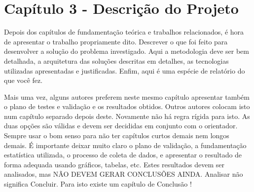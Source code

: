 
\chapter{Capítulo 3 - Descrição do Projeto}
\label{ch:projeto}

Depois dos capítulos de fundamentação teórica e trabalhos relacionados, é hora de apresentar o trabalho propriamente dito. Descrever o que foi feito para desenvolver a solução do problema investigado. Aqui a metodologia deve ser bem detalhada, a arquitetura das soluções descritas em detalhes, as tecnologias utilizadas apresentadas e justificadas. Enfim, aqui é uma espécie de relatório do que você fez. 

Mais uma vez, alguns autores preferem neste mesmo capítulo apresentar também o plano de testes e validação e os resultados obtidos. Outros autores colocam isto num capítulo separado depois deste. Novamente não há regra rígida para isto. As duas opções são válidas e devem ser decididas em conjunto com o orientador. Sempre usar o bom senso para não ter capítulos curtos demais nem longos demais. É importante deixar muito claro o plano de validação, a fundamentação estatística utilizada, o processo de coleta de dados, e apresentar o resultado de forma adequada usando gráficos, tabelas, etc. Estes resultados devem ser analisados, mas NÃO DEVEM GERAR CONCLUSÕES AINDA. Analisar não significa Concluir. Para isto existe um capítulo de Conclusão ! 